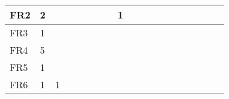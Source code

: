 \begin{table}[]
{\begin{tabular}{|l|l|l|l|l|l|l|l|l|l|l|l|l|l|l|l|l|l|l|}
FR2  & 2                                                     &                                                  &    &    &    &    &                                                  & 1  &    &    &    &                                                   &    &                                                   &    &                                                             &                                                             &                                                             \\ \hline
FR3  & 1                                                     &                                                  &    &    &    &    &                                                  &    &    &    &    &                                                   &    &                                                   &    &                                                             &                                                             &                                                             \\ \hline
FR4  & 5                                                     &                                                  &    &    &    &    &                                                  &    &    &    &    &                                                   &    &                                                   &    &                                                             &                                                             &                                                             \\ \hline
FR5  & 1                                                     &                                                  &    &    &    &    &                                                  &    &    &    &    &                                                   &    &                                                   &    &                                                             &                                                             &                                                             \\ \hline
FR6  & 1                                                     & 1                                                &    &    &    &    &                                                  &    &    &    &    &                                                   &    &                                                   &    &                                                             &                                                             &                                                             \\ \hline

\end{tabular}}
\end{table}
